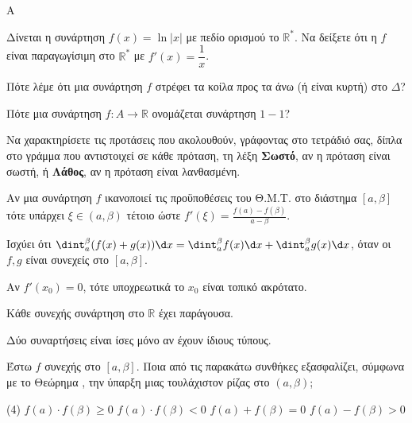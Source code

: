 \begin{thema}{A}
\begin{erwthma}
    \item Δίνεται η συνάρτηση $ f(x)=\ln{|x|} $ με πεδίο ορισμού το $ \mathbb{R}^* $. Να δείξετε ότι η $ f $ είναι παραγωγίσιμη στο $ \mathbb{R}^* $ με $ f'(x)=\dfrac{1}{x} $.
    \item Πότε λέμε ότι μια συνάρτηση $f$ στρέφει τα κοίλα προς τα άνω (ή είναι κυρτή) στο $\Delta$?
    \item Πότε μια συνάρτηση $f:A\to\mathbb{R}$ ονομάζεται συνάρτηση $1-1$?
    \item Να χαρακτηρίσετε τις προτάσεις που ακολουθούν, γράφοντας στο τετράδιό σας, δίπλα στο γράμμα που αντιστοιχεί σε κάθε πρόταση, τη λέξη \textbf{Σωστό}, αν η πρόταση είναι σωστή, ή \textbf{Λάθος}, αν η πρόταση είναι λανθασμένη.
    \begin{alist}
        \item Αν μια συνάρτηση $f$ ικανοποιεί τις προϋποθέσεις του Θ.Μ.Τ. στο διάστημα $[a,\beta]$ τότε υπάρχει $\xi\in(a,\beta)$ τέτοιο ώστε $f'(\xi)=\frac{f(a)-f(\beta)}{a-\beta}$.
        \item Ισχύει ότι $\dint_{a}^{\beta} (f(x) + g(x)) \d x = \dint_{a}^{\beta} f(x) \d x + \dint_{a}^{\beta} g(x) \d x$, όταν οι $f, g$ είναι συνεχείς στο $[a, \beta]$.
        \item Αν $f'(x_0) = 0$, τότε υποχρεωτικά το $x_0$ είναι τοπικό ακρότατο.
        \item Κάθε συνεχής συνάρτηση στο $\mathbb{R}$ έχει παράγουσα.
        \item Δύο συναρτήσεις είναι ίσες μόνο αν έχουν ίδιους τύπους.
\end{alist}
    \item Έστω $f$ συνεχής στο $[a, \beta]$. Ποια από τις παρακάτω συνθήκες εξασφαλίζει, σύμφωνα με το Θεώρημα , την ύπαρξη μιας τουλάχιστον ρίζας στο $(a, \beta)$;
    \begin{tasks}[label=\let\textdexiakeraia\relax\alph*.](4)
        \task $f(a) \cdot f(\beta) \ge 0$
        \task $f(a) \cdot f(\beta) < 0$
        \task $f(a) + f(\beta) = 0$
        \task $f(a) - f(\beta) > 0$
    \end{tasks}
\end{erwthma}
\end{thema}
